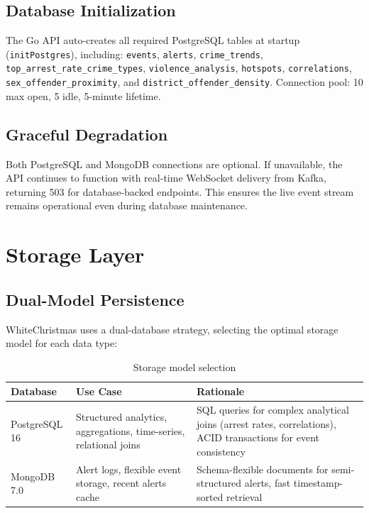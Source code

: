 \documentclass[12pt,a4paper]{article}
\begin{document}
\subsection{Database Initialization}

The Go API auto-creates all required PostgreSQL tables at startup (\texttt{initPostgres}), including: \texttt{events}, \texttt{alerts}, \texttt{crime\_trends}, \texttt{top\_arrest\_rate\_crime\_types}, \texttt{violence\_analysis}, \texttt{hotspots}, \texttt{correlations}, \texttt{sex\_offender\_proximity}, and \texttt{district\_offender\_density}. Connection pool: 10 max open, 5 idle, 5-minute lifetime.

\subsection{Graceful Degradation}

Both PostgreSQL and MongoDB connections are optional. If unavailable, the API continues to function with real-time WebSocket delivery from Kafka, returning 503 for database-backed endpoints. This ensures the live event stream remains operational even during database maintenance.

\section{Storage Layer}

\subsection{Dual-Model Persistence}

WhiteChristmas uses a dual-database strategy, selecting the optimal storage model for each data type:

\begin{table}[H]
\centering
\caption{Storage model selection}
\begin{tabularx}{\textwidth}{l X X}
\toprule
\textbf{Database} & \textbf{Use Case} & \textbf{Rationale} \\
\midrule
PostgreSQL 16 & Structured analytics, aggregations, time-series, relational joins & SQL queries for complex analytical joins (arrest rates, correlations), ACID transactions for event consistency \\
MongoDB 7.0 & Alert logs, flexible event storage, recent alerts cache & Schema-flexible documents for semi-structured alerts, fast timestamp-sorted retrieval \\
\bottomrule
\end{tabularx}
\end{table}
\end{document}
